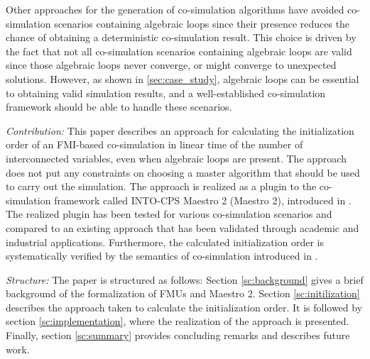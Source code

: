 Other approaches for the generation of co-simulation algorithms have avoided co-simulation scenarios containing algebraic loops since their presence reduces the chance of obtaining a deterministic co-simulation result\cite{Amalio2016CheckingCo-simulation, BromanCompositionCo-Simulation, Gomes2019c}. This choice is driven by the fact that not all co-simulation scenarios containing algebraic loops are valid since those algebraic loops never converge, or might converge to unexpected solutions. However, as shown in \cref{sec:case_study}, algebraic loops can be essential to obtaining valid simulation results, and a well-established co-simulation framework should be able to handle these scenarios. 

\textit{Contribution:} This paper describes an approach for calculating the initialization order of an FMI-based co-simulation in linear time of the number of interconnected variables, even when algebraic loops are present.
The approach does not put any constraints on choosing a master algorithm that should be used to carry out the simulation. 
The approach is realized as a plugin to the co-simulation framework called INTO-CPS Maestro 2 (Maestro 2), introduced in \cite{Thule2019b}.
The realized plugin has been tested for various co-simulation scenarios and compared to an existing approach that has been validated through academic and industrial applications. 
Furthermore, the calculated initialization order is systematically verified by the semantics of co-simulation introduced in \cite{gomes_lucio_vangheluwe_2019,Gomes2019c}. 

\textit{Structure:} The paper is structured as follows: Section \ref{sc:background} gives a brief background of the formalization of FMUs and Maestro 2. Section \ref{sc:initilization} describes the approach taken to calculate the initialization order. It is followed by section \ref{sc:implementation}, where the realization of the approach is presented. Finally, section \ref{sc:summary} provides concluding remarks and describes future work.

